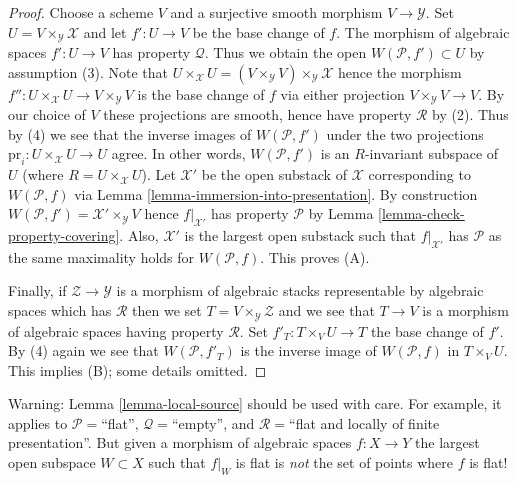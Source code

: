 \begin{proof}
Choose a scheme $V$ and a surjective smooth morphism $V \to \mathcal{Y}$.
Set $U = V \times_\mathcal{Y} \mathcal{X}$ and let $f' : U \to V$ be the
base change of $f$. The morphism of algebraic spaces $f' : U \to V$ has
property $\mathcal{Q}$. Thus we obtain the open $W(\mathcal{P}, f') \subset U$
by assumption (3). Note that
$U \times_\mathcal{X} U =
(V \times_\mathcal{Y} V) \times_\mathcal{Y} \mathcal{X}$
hence the morphism $f'' : U \times_\mathcal{X} U \to V \times_\mathcal{Y} V$
is the base change of $f$ via either projection
$V \times_\mathcal{Y} V \to V$. By our choice of $V$ these projections
are smooth, hence have property $\mathcal{R}$ by (2). Thus by (4) we see
that the inverse images of $W(\mathcal{P}, f')$ under the two projections
$\text{pr}_i : U \times_\mathcal{X} U \to U$ agree. In other words,
$W(\mathcal{P}, f')$ is an $R$-invariant subspace of $U$ (where
$R = U \times_\mathcal{X} U$). Let $\mathcal{X}'$ be the open substack of
$\mathcal{X}$ corresponding to $W(\mathcal{P}, f)$ via
Lemma \ref{lemma-immersion-into-presentation}.
By construction $W(\mathcal{P}, f') = \mathcal{X}' \times_\mathcal{Y} V$
hence $f|_{\mathcal{X}'}$ has property $\mathcal{P}$ by
Lemma \ref{lemma-check-property-covering}.
Also, $\mathcal{X}'$ is the largest open substack
such that $f|_{\mathcal{X}'}$ has $\mathcal{P}$ as the same maximality holds
for $W(\mathcal{P}, f)$. This proves (A).

\medskip\noindent
Finally, if $\mathcal{Z} \to \mathcal{Y}$ is a
morphism of algebraic stacks representable by algebraic spaces which has
$\mathcal{R}$ then we set $T = V \times_\mathcal{Y} \mathcal{Z}$ and
we see that $T \to V$ is a morphism of algebraic spaces having
property $\mathcal{R}$. Set $f'_T : T \times_V U \to T$ the base change
of $f'$. By (4) again we see that $W(\mathcal{P}, f'_T)$ is the
inverse image of $W(\mathcal{P}, f)$ in $T \times_V U$. This implies
(B); some details omitted.
\end{proof}

\begin{remark}
\label{remark-local-source-warning}
Warning:
Lemma \ref{lemma-local-source}
should be used with care. For example, it applies to
$\mathcal{P}=$``flat'', $\mathcal{Q}=$``empty'',
and $\mathcal{R}=$``flat and locally of finite presentation''. But given a
morphism of algebraic spaces $f : X \to Y$ the largest open
subspace $W \subset X$ such that $f|_W$ is flat is {\it not} the set of points
where $f$ is flat!
\end{remark}

